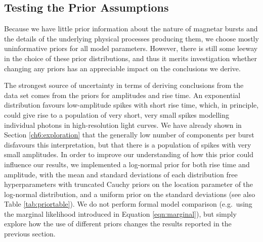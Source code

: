 \documentclass[12pt]{emulateapj}
\begin{document}
\subsection{Testing the Prior Assumptions}
\label{ch6:priortest}
Because we have little prior information about the nature of magnetar bursts and the details of
the underlying physical processes producing them, we choose mostly uninformative priors for all model parameters. However,
there is still some leeway in the choice of these prior distributions, and thus it merits investigation whether changing
any priors has an appreciable impact on the conclusions we derive. 

The strongest source of uncertainty in terms of deriving conclusions from the data set comes from the priors for
amplitudes and rise time. An exponential distribution favours low-amplitude spikes with short rise time, which, in principle,
could give rise to a population of very short, very small spikes modelling individual photons in high-resolution light curves. We have already shown in 
Section \ref{ch6:exploration} that the generally low number of components per burst disfavours this interpretation, but that there is a population of spikes
 with very small amplitudes. In order
to improve our understanding of how this prior could influence our results, we implemented a log-normal prior for both rise time
and amplitude, with the mean and standard deviations of each distribution free hyperparameters with truncated Cauchy priors on the location parameter of
the log-normal distribution, and a uniform prior on the standard deviations (see also Table \ref{tab:priortable}). We do not perform formal model comparison
(e.g.\ using the marginal likelihood introduced in Equation \ref{eqn:marginal}), but simply explore how the use of different priors
changes the results reported in the previous section.
\end{document}
